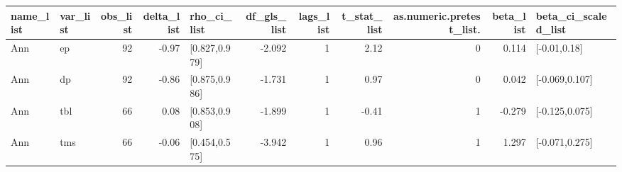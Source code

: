\begin{table}[ht]
\centering
\begin{tabular}{llrrlrrrrrl}
  \hline
name\_list & var\_list & obs\_list & delta\_list & rho\_ci\_list & df\_gls\_list & lags\_list & t\_stat\_list & as.numeric.pretest\_list. & beta\_list & beta\_ci\_scaled\_list \\ 
  \hline
Ann & ep & 92 & -0.97 & [0.827,0.979] & -2.092 & 1 & 2.12 & 0 & 0.114 & [-0.01,0.18] \\ 
  Ann & dp & 92 & -0.86 & [0.875,0.986] & -1.731 & 1 & 0.97 & 0 & 0.042 & [-0.069,0.107] \\ 
  Ann & tbl & 66 & 0.08 & [0.853,0.908] & -1.899 & 1 & -0.41 & 1 & -0.279 & [-0.125,0.075] \\ 
  Ann & tms & 66 & -0.06 & [0.454,0.575] & -3.942 & 1 & 0.96 & 1 & 1.297 & [-0.071,0.275] \\ 
   \hline
\end{tabular}
\end{table}
